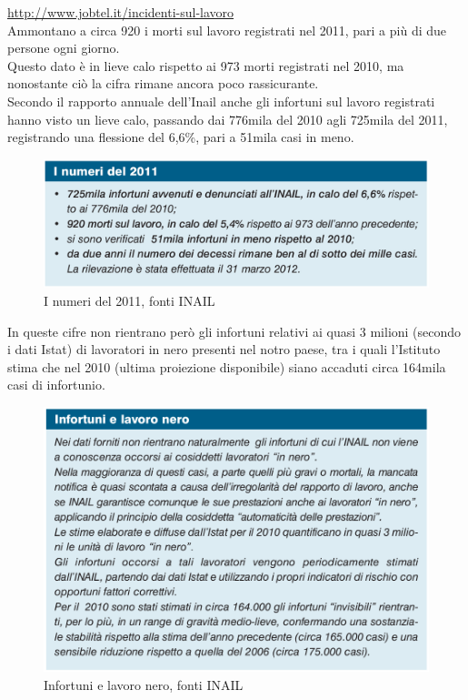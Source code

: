 \url{http://www.jobtel.it/incidenti-sul-lavoro}\\

Ammontano a circa 920 i morti sul lavoro registrati nel 2011, pari a più di due persone ogni giorno.\\
Questo dato è in lieve calo rispetto ai 973 morti registrati nel 2010, ma nonostante ciò la cifra rimane ancora poco rassicurante.\\
Secondo il rapporto annuale dell'Inail anche gli infortuni sul lavoro registrati hanno visto un lieve calo, passando dai 776mila del 2010 agli 725mila del 2011, registrando una flessione del 6,6\%, pari a 51mila casi in meno.\\

\begin{figure}[H]
\centering
\includegraphics[scale=0.3]{images/analisiDiMercato/infortuniGenerale}
\caption{I numeri del 2011, fonti INAIL}
\end{figure}


In queste cifre non rientrano però gli infortuni relativi ai quasi 3 milioni (secondo i dati Istat) di lavoratori in nero presenti nel notro paese, tra i quali l’Istituto stima che nel 2010 (ultima proiezione disponibile) siano accaduti circa 164mila casi di infortunio.\\

\begin{figure}[H]
\centering
\includegraphics[scale=0.4]{images/analisiDiMercato/infortuniLavoroNero}
\caption{Infortuni e lavoro nero, fonti INAIL}
\end{figure}

